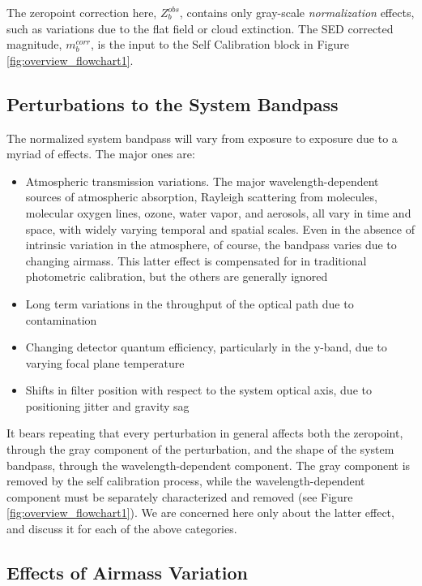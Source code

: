 \documentclass[12pt,preprint]{aastex}
\begin{document}
The zeropoint correction here, $Z_b^{obs}$, contains only gray-scale
{\it normalization} effects, such as variations due to the flat field
or cloud extinction.  The SED corrected magnitude, $m_b^{corr}$, is the input to the Self Calibration block in 
Figure \ref{fig:overview_flowchart1}.
\subsection{Perturbations to the System Bandpass}
The normalized system bandpass will vary from exposure to exposure due to a myriad of effects.  The major ones are:
\begin{itemize}
\item{Atmospheric transmission variations.  The major wavelength-dependent sources of atmospheric absorption, Rayleigh scattering from molecules, molecular oxygen lines, ozone, water vapor, and aerosols, all vary in time and space, with widely varying temporal and spatial scales.  Even in the absence of intrinsic variation in the atmosphere, of course, the bandpass varies due to changing airmass.  This latter effect is compensated for in traditional photometric calibration, but the others are generally ignored}
\item{Long term variations in the throughput of the optical path due to contamination}
\item{Changing detector quantum efficiency, particularly in the y-band, due to varying focal plane temperature}
\item{Shifts in filter position with respect to the system optical axis, due to positioning jitter and gravity sag}
\end{itemize}

It bears repeating that every perturbation in general affects both the zeropoint, through the gray component of the perturbation, and the shape of the system bandpass, through the wavelength-dependent component.  The gray component is removed by the self calibration process, while the wavelength-dependent component must be separately characterized and removed (see Figure \ref{fig:overview_flowchart1}).  We are concerned here only about the latter effect, and discuss it for each of the above categories.

\subsection{Effects of Airmass Variation}
\end{document}
